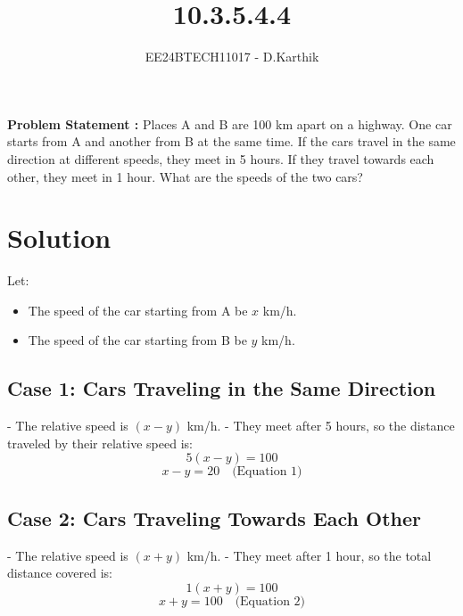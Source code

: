 \documentclass[journal]{IEEEtran}
\begin{document}

\vspace{3cm}

\title{10.3.5.4.4}
\author{EE24BTECH11017 - D.Karthik}
 \maketitle
{\let\newpage\relax\maketitle}

\renewcommand{\thefigure}{\theenumi}
\renewcommand{\thetable}{\theenumi}
\setlength{\intextsep}{10pt} %


\renewcommand{\thetable}{\theenumi}
\textbf{Problem Statement :}
 Places A and B are 100 km apart on a highway. One car starts from A and another
from B at the same time. If the cars travel in the same direction at different speeds,
they meet in 5 hours. If they travel towards each other, they meet in 1 hour. What
are the speeds of the two cars?
\section*{Solution}
Let:
\begin{itemize}
    \item The speed of the car starting from A be \( x \) km/h.
    \item The speed of the car starting from B be \( y \) km/h.
\end{itemize}

\subsection*{Case 1: Cars Traveling in the Same Direction}
- The relative speed is \( (x - y) \) km/h.
- They meet after 5 hours, so the distance traveled by their relative speed is:
  \[
  5(x - y) = 100
  \]
  \[
  x - y = 20 \quad \text{(Equation 1)}
  \]

\subsection*{Case 2: Cars Traveling Towards Each Other}
- The relative speed is \( (x + y) \) km/h.
- They meet after 1 hour, so the total distance covered is:
  \[
  1(x + y) = 100
  \]
  \[
  x + y = 100 \quad \text{(Equation 2)}
  \]
\end{document}
